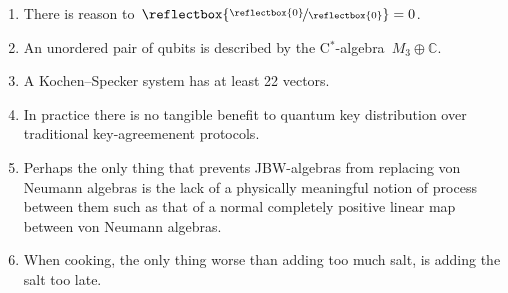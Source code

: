 \documentclass{article}
\newcommand\rfrac[2]{\reflectbox{\nicefrac{\reflectbox{\ensuremath{#1}}}{\reflectbox{\ensuremath{#2}}}}}
\begin{document}
\begin{enumerate}
\item
    There is reason to~$\rfrac{0}{0}=0$.
\item
    An unordered pair of qubits is described
        by the C$^*$-algebra~$M_3 \oplus \mathbb{C}$.
\item
    A Kochen--Specker system has at least 22 vectors.
\item
    In practice there is no tangible benefit
        to quantum key distribution over traditional key-agreemenent protocols.
\item
    Perhaps the only thing that prevents JBW-algebras from replacing
            von Neumann algebras is
            the lack of a physically meaningful notion
            of process between them
            such as that of a normal completely positive linear map
            between von Neumann algebras.
\item
    When cooking,
        the only thing worse than adding too much salt,
        is adding the salt too late.
\end{enumerate}
\end{document}
